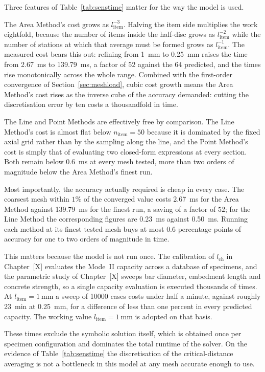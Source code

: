 Three features of Table~\ref{tab:senstime} matter for the way the model is
used.
 
The Area Method's cost grows as $l_{\mathrm{item}}^{-3}$. Halving the item
side multiplies the work eightfold, because the number of items inside the
half-disc grows as $l_{\mathrm{item}}^{-2}$ while the number of stations at
which that average must be formed grows as $l_{\mathrm{item}}^{-1}$. The
measured cost bears this out: refining from \SI{1}{\milli\metre} to
\SI{0.25}{\milli\metre} raises the time from \SI{2.67}{\milli\second} to
\SI{139.79}{\milli\second}, a factor of $52$ against the $64$ predicted, and
the times rise monotonically across the whole range. Combined with the
first-order convergence of Section~\ref{sec:meshload}, cubic cost growth
means the Area Method's cost rises as the inverse cube of the accuracy
demanded: cutting the discretisation error by ten costs a thousandfold in
time.
 
The Line and Point Methods are effectively free by comparison. The Line
Method's cost is almost flat below $n_{\mathrm{item}} = 50$ because it is
dominated by the fixed axial grid rather than by the sampling along the line,
and the Point Method's cost is simply that of evaluating two closed-form
expressions at every section. Both remain below \SI{0.6}{\milli\second} at
every mesh tested, more than two orders of magnitude below the Area Method's
finest run.
 
Most importantly, the accuracy actually required is cheap in every case. The
coarsest mesh within $1\%$ of the converged value costs
\SI{2.67}{\milli\second} for the Area Method against
\SI{139.79}{\milli\second} for the finest run, a saving of a factor of $52$;
for the Line Method the corresponding figures are \SI{0.23}{\milli\second}
against \SI{0.50}{\milli\second}. Running each method at its finest tested
mesh buys at most $0.6$ percentage points of accuracy for one to two orders
of magnitude in time.
 
This matters because the model is not run once. The calibration of
$l_{\mathrm{ch}}$ in Chapter~[X] evaluates the Mode~II capacity across a
database of specimens, and the parametric study of Chapter~[X] sweeps bar
diameter, embedment length and concrete strength, so a single capacity
evaluation is executed thousands of times. At
$l_{\mathrm{item}} = \SI{1}{\milli\metre}$ a sweep of \num{10000} cases costs
under half a minute, against roughly \SI{23}{\minute} at
\SI{0.25}{\milli\metre}, for a difference of less than one percent in every
predicted capacity. The working value $l_{\mathrm{item}} =
\SI{1}{\milli\metre}$ is adopted on that basis.
 
These times exclude the symbolic solution itself, which is obtained once per
specimen configuration and dominates the total runtime of the solver. On the
evidence of Table~\ref{tab:senstime} the discretisation of the
critical-distance averaging is not a bottleneck in this model at any mesh
accurate enough to use.